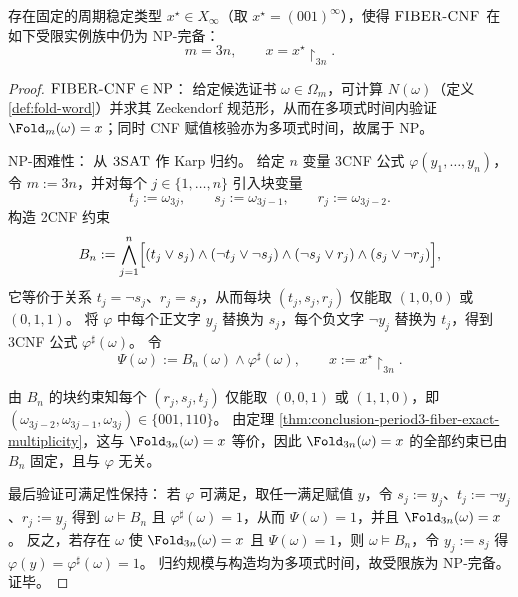 \begin{theorem}\label{thm:conclusion-fiber-cnf-npcomplete-periodic}
存在固定的周期稳定类型 \(x^\star\in X_\infty\)（取 \(x^\star=(001)^\infty\)），使得 \(\text{\normalfont\textsc{FIBER-CNF}}\) 在如下受限实例族中仍为 \(\mathrm{NP}\)-完备：
\[
m=3n,\qquad x=x^\star\!\upharpoonright_{3n}.
\]
\end{theorem}

\begin{proof}
\(\textsc{FIBER-CNF}\in\mathrm{NP}\)：
给定候选证书 \(\omega\in\Omega_m\)，可计算 \(N(\omega)\)（定义 \ref{def:fold-word}）并求其 Zeckendorf 规范形，从而在多项式时间内验证 \(\Fold_m(\omega)=x\)；同时 CNF 赋值核验亦为多项式时间，故属于 \(\mathrm{NP}\)。

\(\mathrm{NP}\)-困难性：
从 \(\textsc{3SAT}\) 作 Karp 归约。
给定 \(n\) 变量 3CNF 公式 \(\varphi(y_1,\dots,y_n)\)，令 \(m:=3n\)，并对每个 \(j\in\{1,\dots,n\}\) 引入块变量
\[
t_j:=\omega_{3j},\qquad s_j:=\omega_{3j-1},\qquad r_j:=\omega_{3j-2}.
\]
构造 2CNF 约束
\[
B_n
:=\bigwedge_{j=1}^{n}\Bigl[(t_j\vee s_j)\wedge(\neg t_j\vee\neg s_j)\wedge(\neg s_j\vee r_j)\wedge(s_j\vee\neg r_j)\Bigr],
\]
它等价于关系 \(t_j=\neg s_j\)、\(r_j=s_j\)，从而每块 \((t_j,s_j,r_j)\) 仅能取 \((1,0,0)\) 或 \((0,1,1)\)。
将 \(\varphi\) 中每个正文字 \(y_j\) 替换为 \(s_j\)，每个负文字 \(\neg y_j\) 替换为 \(t_j\)，得到 3CNF 公式 \(\varphi^\sharp(\omega)\)。
令
\[
\Psi(\omega):=B_n(\omega)\wedge \varphi^\sharp(\omega),
\qquad
x:=x^\star\!\upharpoonright_{3n}.
\]

由 \(B_n\) 的块约束知每个 \((r_j,s_j,t_j)\) 仅能取 \((0,0,1)\) 或 \((1,1,0)\)，即
\(
(\omega_{3j-2},\omega_{3j-1},\omega_{3j})\in\{001,110\}
\)。
由定理 \ref{thm:conclusion-period3-fiber-exact-multiplicity}，这与 \(\Fold_{3n}(\omega)=x\) 等价，因此 \(\Fold_{3n}(\omega)=x\) 的全部约束已由 \(B_n\) 固定，且与 \(\varphi\) 无关。

最后验证可满足性保持：
若 \(\varphi\) 可满足，取任一满足赋值 \(y\)，令 \(s_j:=y_j\)、\(t_j:=\neg y_j\)、\(r_j:=y_j\) 得到 \(\omega\models B_n\) 且 \(\varphi^\sharp(\omega)=1\)，从而 \(\Psi(\omega)=1\)，并且 \(\Fold_{3n}(\omega)=x\)。
反之，若存在 \(\omega\) 使 \(\Fold_{3n}(\omega)=x\) 且 \(\Psi(\omega)=1\)，则 \(\omega\models B_n\)，令 \(y_j:=s_j\) 得 \(\varphi(y)=\varphi^\sharp(\omega)=1\)。
归约规模与构造均为多项式时间，故受限族为 \(\mathrm{NP}\)-完备。证毕。
\end{proof}


